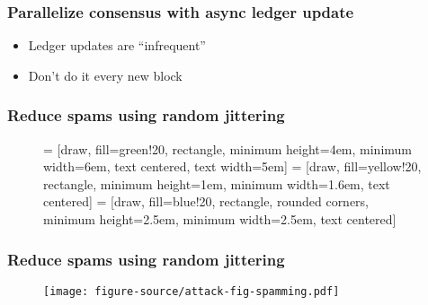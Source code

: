 \documentclass[aspectratio=169]{beamer}
\begin{document}
\begin{frame}
    \frametitle{Parallelize consensus with async ledger update}
    \begin{itemize}
        \item Ledger updates are ``infrequent''
            \pause
        \item Don't do it every new block
    \end{itemize}
\end{frame}

\begin{frame}
    \frametitle{Reduce spams using random jittering}
    \begin{figure}
         = [draw, fill=green!20, rectangle, 
        minimum height=4em, minimum width=6em, text centered, text width=5em]
         = [draw, fill=yellow!20, rectangle, minimum height=1em, minimum width=1.6em, text centered]
         = [draw, fill=blue!20, rectangle, rounded corners, minimum height=2.5em, minimum width=2.5em, text centered]
    \end{figure}
\end{frame}

\begin{frame}
    \frametitle{Reduce spams using random jittering}
    \begin{figure}
        \centering
        \texttt{[image: figure-source/attack-fig-spamming.pdf]}
    \end{figure}
\end{frame}
\end{document}
